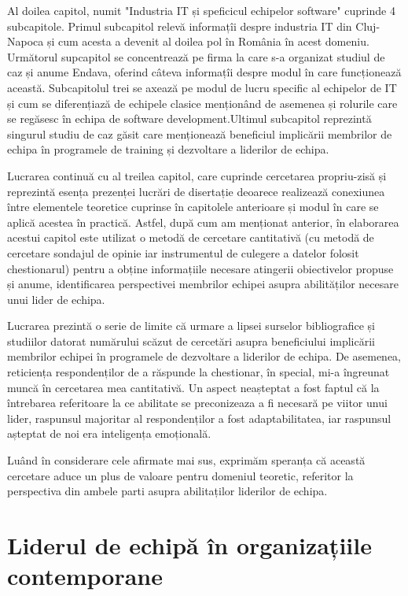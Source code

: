 \documentclass[a4paper, 12pt]{article}
\begin{document}
	\quad Al doilea capitol, numit "Industria IT și speficicul echipelor software" cuprinde 4 subcapitole. Primul subcapitol relevă informațîi despre industria IT din Cluj-Napoca și cum acesta a devenit al doilea pol în România în acest domeniu. Următorul supcapitol se concentrează pe firma la care s-a organizat studiul de caz și anume Endava, oferind câteva informațîi despre modul în care funcționează această. Subcapitolul trei se axează pe modul de lucru specific al echipelor de IT și cum se diferențiază de echipele clasice menționând de asemenea și rolurile care se regăsesc în echipa de software development.Ultimul subcapitol reprezintă singurul studiu de caz găsit care menționează beneficiul implicării membrilor de echipa în programele de training și dezvoltare a liderilor de echipa.

	\quad Lucrarea continuă cu al treilea capitol, care cuprinde cercetarea propriu-zisă și reprezintă esența prezenței lucrări de disertație deoarece realizează conexiunea între elementele teoretice cuprinse în capitolele anterioare și modul în care se aplică acestea în practică. Astfel, după cum am menționat anterior, în elaborarea acestui capitol este utilizat o metodă de cercetare cantitativă (cu metodă de cercetare sondajul de opinie iar instrumentul de culegere a datelor folosit chestionarul) pentru a obține informațiile necesare atingerii obiectivelor propuse și anume, identificarea perspectivei membrilor echipei asupra abilităților necesare unui lider de echipa.

	\quad Lucrarea prezintă o serie de limite că urmare a lipsei surselor bibliografice și studiilor datorat numărului scăzut de cercetări asupra beneficiului implicării membrilor echipei în programele de dezvoltare a liderilor de echipa. De asemenea, reticiența respondenților de a răspunde la chestionar, în special, mi-a îngreunat muncă în cercetarea mea cantitativă. Un aspect neașteptat a fost faptul că la întrebarea referitoare la ce abilitate se preconizeaza a fi necesară pe viitor unui lider, raspunsul majoritar al respondenților a fost adaptabilitatea, iar raspunsul așteptat de noi era inteligența emoțională.

	\quad Luând în considerare cele afirmate mai sus, exprimăm speranța că această cercetare aduce un plus de valoare pentru domeniul teoretic, referitor la perspectiva din ambele parti asupra abilitaților liderilor de echipa.


\newpage
	\setcounter{section}{0}

	\section{Liderul de echipă în organizațiile contemporane}
\end{document}

